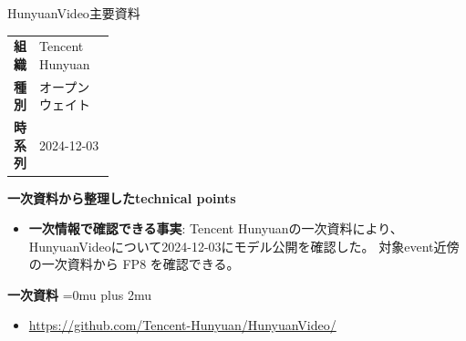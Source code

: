\begin{technicalnote}{HunyuanVideo}{主要資料}
\begingroup
\begin{tabularx}{\linewidth}{@{}>{\bfseries}p{0.22\linewidth}X@{}}
組織 & Tencent Hunyuan \\
種別 & オープンウェイト \\
時系列 & 2024-12-03 \\
\end{tabularx}
\smallskip
{\bfseries 一次資料から整理したtechnical points}
\begin{itemize}[leftmargin=1.5em,itemsep=0.35em]
\item \textbf{一次情報で確認できる事実}: Tencent Hunyuanの一次資料により、HunyuanVideoについて2024-12-03にモデル公開を確認した。 対象event近傍の一次資料から FP8 を確認できる。
\end{itemize}
\begin{minipage}{\linewidth}
\begin{samepage}
{\bfseries 一次資料}
\begingroup\sloppy
\Urlmuskip=0mu plus 2mu\relax
\begin{itemize}[leftmargin=1.5em,itemsep=0.25em]
\item {\scriptsize\url{https://github.com/Tencent-Hunyuan/HunyuanVideo/}}
\end{itemize}
\endgroup
\end{samepage}
\end{minipage}
\endgroup
\end{technicalnote}
\medskip


